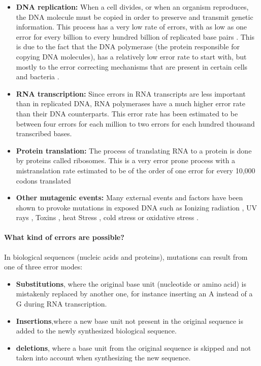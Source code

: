 \documentclass[
  11pt,
  twoside,
  BCOR=10mm,
  listof=totoc]{scrbook}
\providecommand{\tightlist}{%
  \setlength{\itemsep}{0pt}\setlength{\parskip}{0pt}}
\begin{document}
\begin{itemize}
\item
  \textbf{DNA replication:} When a cell divides, or when an organism reproduces, the DNA molecule must be copied in order to preserve and transmit genetic information. This process has a very low rate of errors, with as low as one error for every billion to every hundred billion of replicated base pairs \autocite{fijalkowska2012}. This is due to the fact that the DNA polymerase (the protein responsible for copying DNA molecules), has a relatively low error rate to start with, but mostly to the error correcting mechanisms that are present in certain cells and bacteria \autocite{pray2008dna}.
\item
  \textbf{RNA transcription:} Since errors in RNA transcripts are less important than in replicated DNA, RNA polymerases have a much higher error rate than their DNA counterparts. This error rate has been estimated to be between four errors for each million \autocite{gout2013} to two errors for each hundred thousand \autocite{gout2017} transcribed bases.
\item
  \textbf{Protein translation:} The process of translating RNA to a protein is done by proteins called ribosomes. This is a very error prone process with a mistranslation rate estimated to be of the order of one error for every 10,000 codons translated \autocite{shcherbakovRibosomalMistranslationLeads2019}
\item
  \textbf{Other mutagenic events:} Many external events and factors have been shown to provoke mutations in exposed DNA such as Ionizing radiation \autocite{desouky2015}, UV rays \autocite{kiefer2007}, Toxins \autocite{bennett2003}, heat Stress \autocite{kantidze2016}, cold stress \autocite{gregory1994} or oxidative stress \autocite{gafter-gvili2013}.
\end{itemize}

\hypertarget{what-kind-of-errors-are-possible}{%
\paragraph{What kind of errors are possible?}\label{what-kind-of-errors-are-possible}}

In biological sequences (nucleic acids and proteins), mutations can result from one of three error modes:

\begin{itemize}
\tightlist
\item
  \textbf{Substitutions}, where the original base unit (nucleotide or amino acid) is mistakenly replaced by another one, for instance inserting an A instead of a G during RNA transcription.
\item
  \textbf{Insertions},where a new base unit not present in the original sequence is added to the newly synthesized biological sequence.
\item
  \textbf{deletions}, where a base unit from the original sequence is skipped and not taken into account when synthesizing the new sequence.
\end{itemize}
\end{document}
